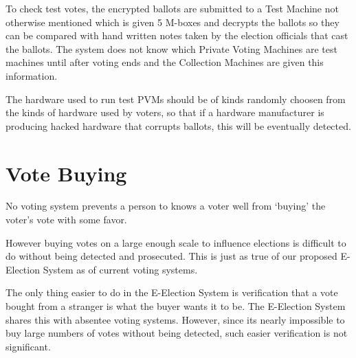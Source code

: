 \documentclass[12pt]{article}
\begin{document}
To check test votes, the encrypted ballots are submitted to a Test
Machine not otherwise mentioned which is given 5 M-boxes and
decrypts the ballots so they can be compared with hand written
notes taken by the election officials that cast the ballots.
The system does not know which Private Voting Machines are test
machines until after voting ends and the Collection Machines
are given this information.

The hardware used to run test PVMs should be of kinds randomly
choosen from the kinds of hardware used by voters, so that if a
hardware manufacturer is producing hacked hardware that corrupts
ballots, this will be eventually detected.

\section{Vote Buying}

No voting system prevents a person to knows a voter well from
`buying' the voter's vote with some favor.

However buying votes on a large enough scale to influence elections
is difficult to do without being detected and prosecuted.
This is just as true of our proposed E-Election System as of
current voting systems.

The only thing easier to do in the E-Election System is verification
that a vote bought from a stranger
is what the buyer wants it to be.  The E-Election
System shares this with absentee voting systems.  However, since its
nearly impossible to buy large numbers of votes without being detected,
such easier verification is not significant.
\end{document}
